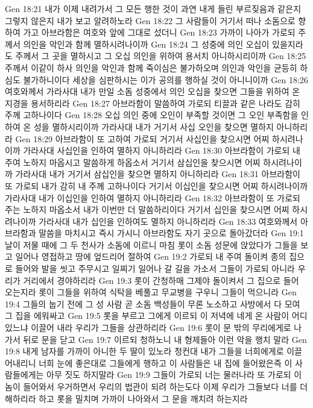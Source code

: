 Gen 18:21  내가 이제 내려가서 그 모든 행한 것이 과연 내게 들린 부르짖음과 같은지 그렇지 않은지 내가 보고 알려하노라
Gen 18:22  그 사람들이 거기서 떠나 소돔으로 향하여 가고 아브라함은 여호와 앞에 그대로 섰더니
Gen 18:23  가까이 나아가 가로되 주께서 의인을 악인과 함께 멸하시려나이까
Gen 18:24  그 성중에 의인 오십이 있을지라도 주께서 그 곳을 멸하시고 그 오십 의인을 위하여 용서치 아니하시리이까
Gen 18:25  주께서 이같이 하사 의인을 악인과 함께 죽이심은 불가하오며 의인과 악인을 균등히 하심도 불가하니이다 세상을 심판하시는 이가 공의를 행하실 것이 아니니이까
Gen 18:26  여호와께서 가라사대 내가 만일 소돔 성중에서 의인 오십을 찾으면 그들을 위하여 온 지경을 용서하리라
Gen 18:27  아브라함이 말씀하여 가로되 티끌과 같은 나라도 감히 주께 고하나이다
Gen 18:28  오십 의인 중에 오인이 부족할 것이면 그 오인 부족함을 인하여 온 성을 멸하시리이까 가라사대 내가 거기서 사십 오인을 찾으면 멸하지 아니하리라
Gen 18:29  아브라함이 또 고하여 가로되 거기서 사십인을 찾으시면 어찌 하시려나이까 가라사대 사십인을 인하여 멸하지 아니하리라
Gen 18:30  아브라함이 가로되 내 주여 노하지 마옵시고 말씀하게 하옵소서 거기서 삼십인을 찾으시면 어찌 하시려나이까 가라사대 내가 거기서 삼십인을 찾으면 멸하지 아니하리라
Gen 18:31  아브라함이 또 가로되 내가 감히 내 주께 고하나이다 거기서 이십인을 찾으시면 어찌 하시려나이까 가라사대 내가 이십인을 인하여 멸하지 아니하리라
Gen 18:32  아브라함이 또 가로되 주는 노하지 마옵소서 내가 이번만 더 말씀하리이다 거기서 십인을 찾으시면 어찌 하시려나이까 가라사대 내가 십인을 인하여도 멸하지 아니하리라
Gen 18:33  여호와께서 아브라함과 말씀을 마치시고 즉시 가시니 아브라함도 자기 곳으로 돌아갔더라
Gen 19:1  날이 저물 때에 그 두 천사가 소돔에 이르니 마침 롯이 소돔 성문에 앉았다가 그들을 보고 일어나 영접하고 땅에 엎드리어 절하여
Gen 19:2  가로되 내 주여 돌이켜 종의 집으로 들어와 발을 씻고 주무시고 일찌기 일어나 갈 길을 가소서 그들이 가로되 아니라 우리가 거리에서 경야하리라
Gen 19:3  롯이 간청하매 그제야 돌이켜서 그 집으로 들어 오는지라 롯이 그들을 위하여 식탁을 베풀고 무교병을 구우니 그들이 먹으니라
Gen 19:4  그들의 눕기 전에 그 성 사람 곧 소돔 백성들이 무론 노소하고 사방에서 다 모여 그 집을 에워싸고
Gen 19:5  롯을 부르고 그에게 이르되 이 저녁에 네게 온 사람이 어디 있느냐 이끌어 내라 우리가 그들을 상관하리라
Gen 19:6  롯이 문 밖의 무리에게로 나가서 뒤로 문을 닫고
Gen 19:7  이르되 청하노니 내 형제들아 이런 악을 행치 말라
Gen 19:8  내게 남자를 가까이 아니한 두 딸이 있노라 청컨대 내가 그들을 너희에게로 이끌어내리니 너희 눈에 좋은대로 그들에게 행하고 이 사람들은 내 집에 들어왔은즉 이 사람들에게는 아무 짓도 하지말라
Gen 19:9  그들이 가로되 너는 물러나라 또 가로되 이놈이 들어와서 우거하면서 우리의 법관이 되려 하는도다 이제 우리가 그들보다 너를 더 해하리라 하고 롯을 밀치며 가까이 나아와서 그 문을 깨치려 하는지라
